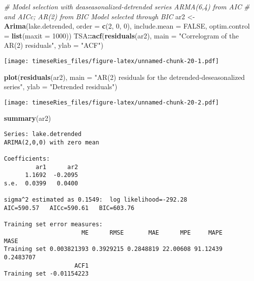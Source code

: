 \documentclass[]{book}
\newenvironment{Shaded}{\begin{snugshade}}{\end{snugshade}}
\newcommand{\CommentTok}[1]{\textcolor[rgb]{0.56,0.35,0.01}{\textit{#1}}}
\newcommand{\DataTypeTok}[1]{\textcolor[rgb]{0.13,0.29,0.53}{#1}}
\newcommand{\DecValTok}[1]{\textcolor[rgb]{0.00,0.00,0.81}{#1}}
\newcommand{\KeywordTok}[1]{\textcolor[rgb]{0.13,0.29,0.53}{\textbf{#1}}}
\newcommand{\NormalTok}[1]{#1}
\newcommand{\OperatorTok}[1]{\textcolor[rgb]{0.81,0.36,0.00}{\textbf{#1}}}
\newcommand{\OtherTok}[1]{\textcolor[rgb]{0.56,0.35,0.01}{#1}}
\newcommand{\StringTok}[1]{\textcolor[rgb]{0.31,0.60,0.02}{#1}}
\begin{document}
\begin{Shaded}
\begin{Highlighting}[]
\CommentTok{# Model selection with deaseasonalized-detrended series ARMA(6,4) from AIC}
\CommentTok{# and AICc; AR(2) from BIC Model selected through BIC}
\NormalTok{ar2 <-}\StringTok{ }\KeywordTok{Arima}\NormalTok{(lake.detrended, }\DataTypeTok{order =} \KeywordTok{c}\NormalTok{(}\DecValTok{2}\NormalTok{, }\DecValTok{0}\NormalTok{, }\DecValTok{0}\NormalTok{), }\DataTypeTok{include.mean =} \OtherTok{FALSE}\NormalTok{, }\DataTypeTok{optim.control =} \KeywordTok{list}\NormalTok{(}\DataTypeTok{maxit =} \DecValTok{1000}\NormalTok{))}
\NormalTok{TSA}\OperatorTok{::}\KeywordTok{acf}\NormalTok{(}\KeywordTok{residuals}\NormalTok{(ar2), }\DataTypeTok{main =} \StringTok{"Correlogram of the AR(2) residuals"}\NormalTok{, }\DataTypeTok{ylab =} \StringTok{"ACF"}\NormalTok{)}
\end{Highlighting}
\end{Shaded}

\texttt{[image: timeseRies\_files/figure-latex/unnamed-chunk-20-1.pdf]}

\begin{Shaded}
\begin{Highlighting}[]
\KeywordTok{plot}\NormalTok{(}\KeywordTok{residuals}\NormalTok{(ar2), }\DataTypeTok{main =} \StringTok{"AR(2) residuals for the detrended-deseasonalized series"}\NormalTok{, }
    \DataTypeTok{ylab =} \StringTok{"Detrended residuals"}\NormalTok{)}
\end{Highlighting}
\end{Shaded}

\texttt{[image: timeseRies\_files/figure-latex/unnamed-chunk-20-2.pdf]}

\begin{Shaded}
\begin{Highlighting}[]
\KeywordTok{summary}\NormalTok{(ar2)}
\end{Highlighting}
\end{Shaded}

\begin{verbatim}
Series: lake.detrended 
ARIMA(2,0,0) with zero mean 

Coefficients:
         ar1      ar2
      1.1692  -0.2095
s.e.  0.0399   0.0400

sigma^2 estimated as 0.1549:  log likelihood=-292.28
AIC=590.57   AICc=590.61   BIC=603.76

Training set error measures:
                      ME      RMSE       MAE      MPE     MAPE      MASE
Training set 0.003821393 0.3929215 0.2848819 22.00608 91.12439 0.2483707
                    ACF1
Training set -0.01154223
\end{verbatim}
\end{document}

